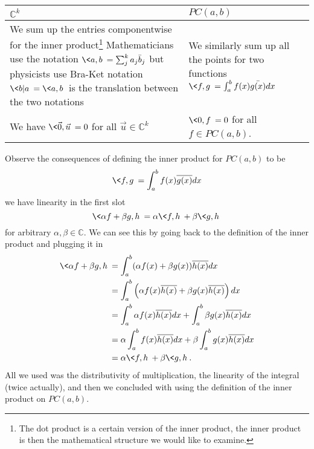 \begin{tabular}{|p{}|p{}|}
\hline 
$\mathbb{C}^{k}$ & $PC(a,b)$ \\ 
\hline
We sum up the entries componentwise\newline
for the inner product\footnote{The dot product is a certain
  version of the inner product, the inner product is then
  the mathematical structure we would like to examine.}
Mathematicians use the notation\newline
$\<a,b\> = \sum^{k}_{j}a_{j}\bar{b}_{j}$\newline
but physicists use Bra-Ket notation\newline
$\<b|a\>=\<a,b\>$ is the translation between the two notations
&
We similarly sum up all the points for two functions\newline
$\<f,g\> = \int^{b}_{a}f(x)\bar{g(x)}dx$ \\ \hline
We have $\<\vec{0},\vec{u}\>=0$ for all
$\vec{u}\in\mathbb{C}^k$ &
$\<0,f\>=0$ for all $f\in PC(a,b)$. \\ \hline
\end{tabular}

Observe the consequences of defining the inner product for
$PC(a,b)$ to be
\begin{equation}
\<f,g\> = \int^{b}_{a}f(x)\overline{g(x)}dx
\end{equation}
we have linearity in the first slot
\begin{equation}
\<\alpha f + \beta g, h\> = \alpha\<f,h\> + \beta\<g,h\>
\end{equation}
for arbitrary $\alpha,\beta\in\mathbb{C}$. We can see this
by going back to the definition of the inner product and
plugging it in
\begin{subequations}
\begin{align}
\<\alpha f + \beta g, h\> &= \int^{b}_{a}(\alpha f(x) +
\beta g(x))\overline{h(x)}dx \\
&= \int^{b}_{a}\left(\alpha f(x)\overline{h(x)} + \beta
g(x)\overline{h(x)}\right)dx\\
&= \int^{b}_{a} \alpha f(x)\overline{h(x)}dx +
\int^{b}_{a}\beta g(x)\overline{h(x)}dx\\
&= \alpha\int^{b}_{a}f(x)\overline{h(x)}dx +
\beta\int^{b}_{a}g(x)\overline{h(x)}dx\\
&= \alpha\<f,h\> + \beta\<g,h\>.
\end{align}
\end{subequations}
All we used was the distributivity of multiplication, the
linearity of the integral (twice actually), and then we
concluded with using the definition of the inner product on
$PC(a,b)$.

